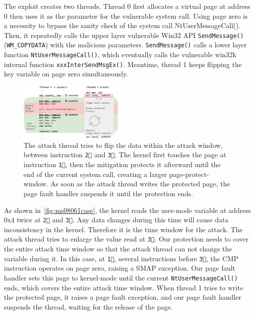 The exploit creates two threads. Thread 0 first allocates a virtual page at address 0 then uses it as the parameter for the vulnerable system call. Using page zero is a necessity to bypass the sanity check of the system call NtUserMessageCall(). Then, it repeatedly calls the upper layer vulnerable Win32 API \texttt{SendMessage()} (\texttt{WM\_COPYDATA}) with the malicious parameters. \texttt{SendMessage()} calls a lower layer function \texttt{NtUserMessageCall()}, which eventually calls the vulnerable win32k internal function \texttt{xxxInterSendMsgEx()}. Meantime, thread 1 keeps flipping the key variable on page zero simultaneously.


\begin{figure}[th]
  \includegraphics[width=0.47\textwidth]{figures/ms08061case2}
  \centering
  \caption{The attack thread tries to flip the data within the attack window, between instruction \texttt{\textcircled{2}} and \texttt{\textcircled{3}}. The kernel first touches the page at instruction \texttt{\textcircled{1}}, then the mitigation protects it afterward until the end of the current system call, creating a larger page-protect-window. As soon as the attack thread writes the protected page, the page fault handler suspends it until the protection ends.}
  \label{fig:ms08061case}
\end{figure}


As shown in~\autoref{fig:ms08061case}, the kernel reads the user-mode variable at address 0x4 twice at \texttt{\textcircled{2}} and \texttt{\textcircled{3}}. Any data changes during this time will cause data inconsistency in the kernel. Therefore it is the time window for the attack. The attack thread tries to enlarge the value read at \texttt{\textcircled{3}}. Our protection needs to cover the entire attack time window so that the attack thread can not change the variable during it. In this case, at \texttt{\textcircled{1}}, several instructions before \texttt{\textcircled{3}}, the CMP instruction operates on page zero, raising a SMAP exception. Our page fault handler sets this page to kernel-mode until the current \texttt{NtUserMessageCall()} ends, which covers the entire attack time window. When thread 1 tries to write the protected page, it raises a page fault exception, and our page fault handler suspends the thread, waiting for the release of the page.




